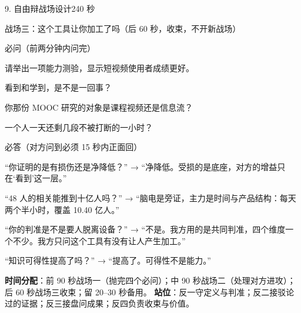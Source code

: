 \documentclass[script,con]{debate}
\begin{document}
\begin{stage}{9. 自由辩战场设计}{240 秒}
\begin{battleground}{战场三：这个工具让你加工了吗（后 60 秒，收束，不开新战场）}
\begin{fields}
\end{fields}
\begin{points}{必问（前两分钟内问完）}
\item 请举出一项能力测验，显示短视频使用者成绩更好。
\item 看到和学到，是不是一回事？
\item 你那份 MOOC 研究的对象是课程视频还是信息流？
\item 一个人一天还剩几段不被打断的一小时？
\end{points}
\begin{points}{必答（对方问到必须 15 秒内正面回）}
\item “你证明的是有损伤还是净降低？” → “净降低。受损的是底座，对方的增益只在‘看到’这一层。”
\item “48 人的相关能推到十亿人吗？” → “脑电是旁证，主力是时间与产品结构：每天两个半小时，覆盖 10.40 亿人。”
\item “你的判准是不是要人脱离设备？” → “不是。我方用的是共同判准，四个维度一个不少。我方只问这个工具有没有让人产生加工。”
\item “知识可得性提高了吗？” → “提高了。可得性不是能力。”
\end{points}
\textbf{时间分配}：前 90 秒战场一（抛完四个必问）；中 90 秒战场二（处理对方进攻）；后 60 秒战场三收束；留 20–30 秒备用。
\textbf{站位}：反一守定义与判准；反二接驳论过的证据；反三接盘问成果；反四负责收束与价值。
\end{battleground}
\end{stage}
\end{document}

